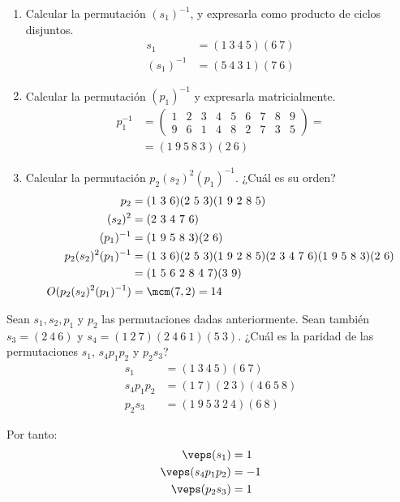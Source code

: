\begin{ejercicio}
\begin{enumerate}
        \item Calcular la permutación $(s_1)^{-1}$, y expresarla como producto de ciclos disjuntos.
        \begin{align*}
            s_1 &= (1\ 3\ 4\ 5)(6\ 7)\\
            (s_1)^{-1} &= (5\ 4\ 3\ 1)(7\ 6)
        \end{align*}
        \item Calcular la permutación $(p_1)^{-1}$ y expresarla matricialmente.
        \begin{align*}
            p_1^{-1} &=
            \begin{pmatrix}
                1 & 2 & 3 & 4 & 5 & 6 & 7 & 8 & 9 \\
                9 & 6 & 1 & 4 & 8 & 2 & 7 & 3 & 5
            \end{pmatrix}
            =\\&= (1\ 9\ 5\ 8\ 3)(2\ 6)
        \end{align*}
        \item Calcular la permutación $p_2(s_2)^2(p_1)^{-1}$. ¿Cuál es su orden?
        \begin{align*}
            p_2 &= (1\ 3\ 6)(2\ 5\ 3)(1\ 9\ 2\ 8\ 5)\\
            (s_2)^2 &= (2\ 3\ 4\ 7\ 6)\\
            (p_1)^{-1} &= (1\ 9\ 5\ 8\ 3)(2\ 6)\\
            p_2(s_2)^2(p_1)^{-1} &= (1\ 3\ 6)(2\ 5\ 3)(1\ 9\ 2\ 8\ 5)(2\ 3\ 4\ 7\ 6)(1\ 9\ 5\ 8\ 3)(2\ 6)\\
            &= (1\ 5\ 6\ 2\ 8\ 4\ 7)(3\ 9)\\
            O(p_2(s_2)^2(p_1)^{-1}) &= \mcm(7, 2) = 14
        \end{align*}
    \end{enumerate}
\end{ejercicio}

\begin{ejercicio}\label{ej:2.18}
    Sean $s_1, s_2, p_1$ y $p_2$ las permutaciones dadas anteriormente. Sean también $s_3 = (2\ 4\ 6)$ y $s_4 = (1\ 2\ 7)(2\ 4\ 6\ 1)(5\ 3)$. ¿Cuál es la paridad de las permutaciones $s_1$, $s_4p_1p_2$ y $p_2s_3$?
    \begin{align*}
        s_1 &= (1\ 3\ 4\ 5)(6\ 7)\\
        s_4p_1p_2 &= (1\ 7)(2\ 3)(4\ 6\ 5\ 8)\\
        p_2s_3 &= (1\ 9\ 5\ 3\ 2\ 4)(6\ 8)
    \end{align*}

    Por tanto:
    \begin{align*}
        \veps(s_1) &= 1\\
        \veps(s_4p_1p_2) &= -1\\
        \veps(p_2s_3) &= 1
    \end{align*}
\end{ejercicio}

